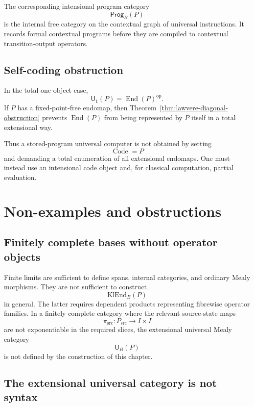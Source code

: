 The corresponding intensional program category
\[
        \mathsf{Prog}_B(P)
\]
is the internal free category on the contextual graph of universal instructions.  It records formal
contextual programs before they are compiled to contextual transition-output operators.

\subsection{Self-coding obstruction}

In the total one-object case,
\[
        \mathsf U_1(P)=\operatorname{End}(P)^{\operatorname{op}}.
\]
If \(P\) has a fixed-point-free endomap, then
Theorem~\ref{thm:lawvere-diagonal-obstruction} prevents \(\operatorname{End}(P)\) from being
represented by \(P\) itself in a total extensional way.

Thus a stored-program universal computer is not obtained by setting
\[
        \operatorname{Code}=P
\]
and demanding a total enumeration of all extensional endomaps.  One must instead use an
intensional code object and, for classical computation, partial evaluation.

\section{Non-examples and obstructions}
\label{sec:nonexamples-obstructions-universal-mealy}

\subsection{Finitely complete bases without operator objects}

Finite limits are sufficient to define spans, internal categories, and ordinary Mealy morphisms.
They are not sufficient to construct
\[
        \mathrm{KlEnd}_B(P)
\]
in general.  The latter requires dependent products representing fibrewise operator families.  In
a finitely complete category where the relevant source-state maps
\[
        \pi_{\mathrm{src}}:P_{\mathrm{src}}\to I\times I
\]
are not exponentiable in the required slices, the extensional universal Mealy category
\[
        \mathsf U_B(P)
\]
is not defined by the construction of this chapter.

\subsection{The extensional universal category is not syntax}

